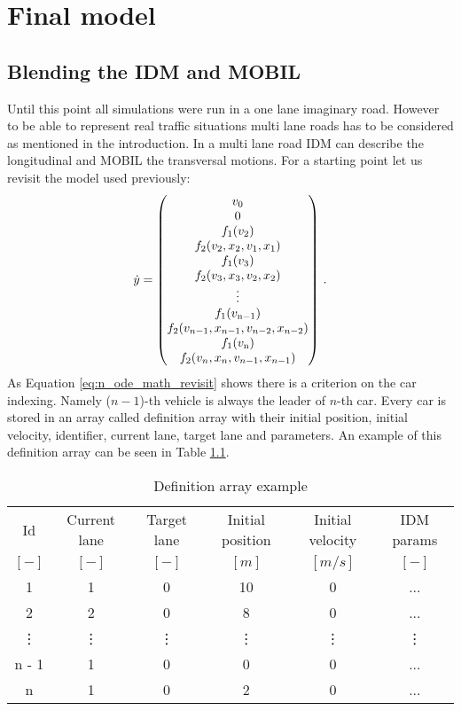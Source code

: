 \chapter{Final model}
	\section{Blending the IDM and MOBIL}
		Until this point all simulations were run in a one lane imaginary road. However to be able to represent real traffic situations multi lane roads has to be considered as mentioned in the introduction. In a multi lane road IDM can describe the longitudinal and MOBIL the transversal motions. For a starting point let us revisit the model used previously:
		\begin{equation}
			\dot{y}=
			\begin{pmatrix}
			v_0\\
			0\\
			f_1(v_{2})\\
			f_2(v_{2}, x_{2},v_{1}, x_{1})\\
			f_1(v_{3})\\
			f_2(v_{3}, x_{3},v_{2}, x_{2})\\
			\vdots\\
			f_1(v_{\rm n-1})\\
			f_2(v_{n-1}, x_{n-1},v_{n-2}, x_{n-2})\\
			f_1(v_{\rm n})\\
			f_2(v_{n}, x_{n},v_{n-1}, x_{n-1})
			\end{pmatrix}\,.
			\label{eq:n_ode_math_revisit}
		\end{equation}
		As Equation \ref{eq:n_ode_math_revisit} shows there is a criterion on the car indexing.  Namely ($n-1$)-th vehicle is always the leader of $n$-th car. Every car is stored in an array called definition array with their initial position, initial velocity, identifier, current lane, target lane and parameters. An example of this definition array can be seen in Table \ref{tab:definition_array}.
		\begin{table}
			\begin{center}
				\begin{tabular}{ |c|c|c|c|c|c| }
					\hline
					Id & Current lane & Target lane & Initial position & Initial velocity& IDM params\\
					$[-]$ & $[-]$ & $[-]$ & $[m]$ & $[m/s]$ & $[-]$\\
					\hline
					1 & 1 & 0 & 10 & 0 & ...\\
					2 & 2 & 0 & 8 & 0 & ...\\
					\vdots & \vdots & \vdots & \vdots & \vdots & \vdots\\
					n - 1 & 1 & 0 & 0 & 0 & ...\\
					n & 1 & 0 & 2 & 0 & ...\\
					\hline
				\end{tabular}
			\end{center}
			\caption{Definition array example}
			\label{tab:definition_array}
		\end{table}
